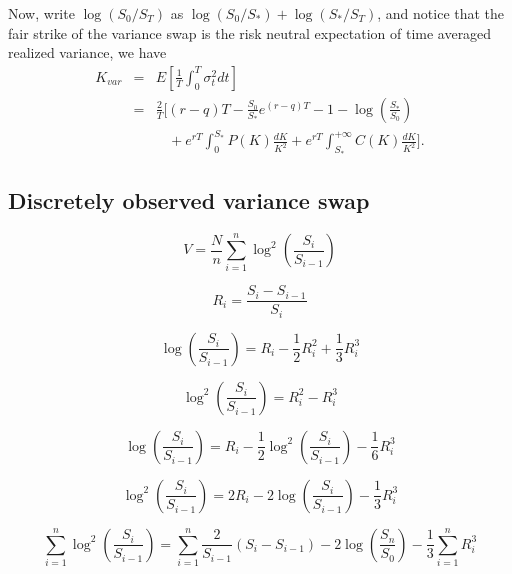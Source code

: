\documentclass[12pt]{article}
\begin{document}
    Now, write $\log(S_0/S_T)$ as $\log(S_0/S_*)+\log(S_*/S_T)$, and notice that the fair strike of the variance swap is
    the risk neutral expectation of time averaged realized variance, we have
    \begin{eqnarray}
      K_{var} &=& E\left[\frac{1}{T}\int_0^T\sigma_t^2dt\right]\nonumber\\
              &=& \frac{2}{T}\Bigg[(r-q)T-\frac{S_0}{S_*}e^{(r-q)T}-1-\log\left(\frac{S_*}{S_0}\right)\nonumber\\
              &&\ \ \ \ +e^{rT}\int_0^{S_*}P(K)\frac{dK}{K^2}+e^{rT}\int_{S_*}^{+\infty}C(K)\frac{dK}{K^2}\Bigg].
    \end{eqnarray}


  \subsection{Discretely observed variance swap}

    \begin{equation}
      V = \frac{N}{n}\sum_{i=1}^n\log^2\left(\frac{S_i}{S_{i-1}}\right)
    \end{equation}

    \begin{equation}
      R_i=\frac{S_i-S_{i-1}}{S_i}
    \end{equation}

    \begin{equation}
      \log\left(\frac{S_i}{S_{i-1}}\right)=R_i-\frac{1}{2}R_i^2+\frac{1}{3}R_i^3
    \end{equation}

    \begin{equation}
      \log^2\left(\frac{S_i}{S_{i-1}}\right)=R_i^2-R_i^3
    \end{equation}

    \begin{equation}
      \log\left(\frac{S_i}{S_{i-1}}\right)=R_i-\frac{1}{2}\log^2\left(\frac{S_i}{S_{i-1}}\right)-\frac{1}{6}R_i^3
    \end{equation}

    \begin{equation}
      \log^2\left(\frac{S_i}{S_{i-1}}\right)=2R_i-2\log\left(\frac{S_i}{S_{i-1}}\right)-\frac{1}{3}R_i^3
    \end{equation}

    \begin{equation}
      \sum_{i=1}^n\log^2\left(\frac{S_i}{S_{i-1}}\right)=\sum_{i=1}^n\frac{2}{S_{i-1}}(S_i-S_{i-1})-2\log\left(\frac{S_n}{S_0}\right)-\frac{1}{3}\sum_{i=1}^nR_i^3
    \end{equation}
\end{document}
